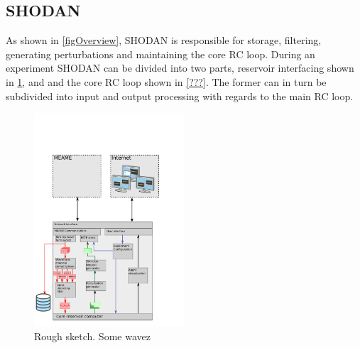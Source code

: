 \subsection{SHODAN}
As shown in \ref{figOverview}, SHODAN is responsible for storage, filtering,
generating perturbations and maintaining the core RC loop.
During an experiment SHODAN can be divided into two parts, reservoir interfacing
shown in \ref{figSHODANiface}, and and the core RC loop shown in \ref{???}.
The former can in turn be subdivided into input and output processing with
regards to the main RC loop.
\begin{figure}[h!]
  \centering
  \includegraphics[width=0.5\textwidth]{fig/SHODANfrontend.png}
  \caption{Rough sketch.
    Some wavez
  }
  \label{figSHODANiface}
\end{figure}
